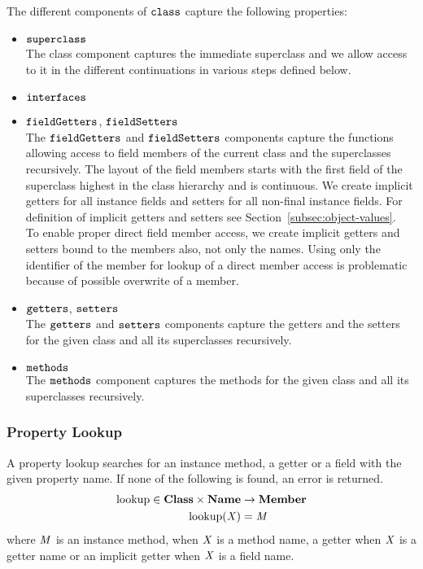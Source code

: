 \documentclass[a4paper,oneside]{article}
\DeclareMathOperator{\lookup}{lookup}
\begin{document}
The different components of $\tt{class}$ capture the following properties:

\begin{itemize}
    \item $\tt{superclass}$\\
        The class component captures the immediate superclass and we allow access to it in the different continuations in various steps defined below.

    \item $\tt{interfaces}$\\

    \item $\tt{fieldGetters}$, $\tt{fieldSetters}$\\
        The $\tt{fieldGetters}$ and $\tt{fieldSetters}$ components capture the functions allowing access to field members of the current class and the superclasses recursively.
        The layout of the field members starts with the first field of the superclass highest in the class hierarchy and is continuous.
        We create implicit getters for all instance fields and setters for all non-final instance fields.
        For definition of implicit getters and setters see Section~\ref{subsec:object-values}.\\
        To enable proper direct field member access, we create implicit getters and setters bound to the members also, not only the names.
        Using only the identifier of the member for lookup of a direct member access is problematic because of possible overwrite of a member.

    \item $\tt{getters}$, $\tt{setters}$\\
        The $\tt{getters}$ and $\tt{setters}$ components capture the getters and the setters for the given class and all its superclasses recursively.

    \item $\tt{methods}$\\
        The $\tt{methods}$ component captures the methods for the given class and all its superclasses recursively.

\end{itemize}


\subsubsection{Property Lookup}
\label{subsubsec:property-lookup}

A property lookup searches for an instance method, a getter or a field with the given property name. If none of the following is found, an error is returned.
\begin{align*}
    \lookup \in \dclass \times \mathbf{Name} &\rightarrow \mathbf{Member}\\
    \lookup(\idmeta) &= \membermeta
\end{align*}
where $\mathit{M}$ is an instance method, when $\mathit{X}$ is a method name, a getter when $\mathit{X}$ is a getter name or an implicit getter when $\mathit{X}$ is a field name.
\end{document}
